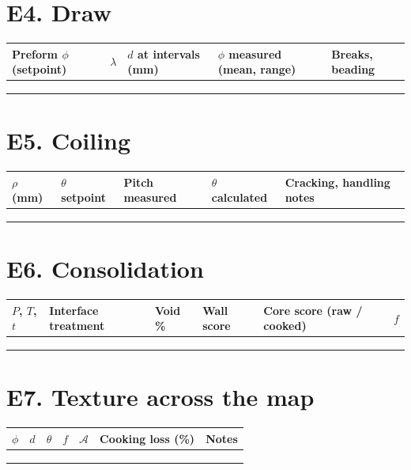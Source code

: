 \documentclass[11pt,openany]{book}
\theoremstyle{definition}
\begin{document}
\section*{E4. Draw}
\begin{center}
\small
\begin{tabularx}{\linewidth}{@{}lXXXX@{}}
\toprule
Preform $\phi$ (setpoint) & $\lambda$ & $d$ at intervals (mm) & $\phi$ measured (mean, range) & Breaks, beading \\
\midrule
 & & & & \\ \midrule
 & & & & \\ \midrule
 & & & & \\
\bottomrule
\end{tabularx}
\end{center}

\section*{E5. Coiling}
\begin{center}
\small
\begin{tabularx}{\linewidth}{@{}lXXXX@{}}
\toprule
$\rho$ (mm) & $\theta$ setpoint & Pitch measured & $\theta$ calculated & Cracking, handling notes \\
\midrule
 & & & & \\ \midrule
 & & & & \\ \midrule
 & & & & \\
\bottomrule
\end{tabularx}
\end{center}

\section*{E6. Consolidation}
\begin{center}
\small
\begin{tabularx}{\linewidth}{@{}lXXXXX@{}}
\toprule
$P$, $T$, $t$ & Interface treatment & Void \% & Wall score & Core score (raw / cooked) & $f$ \\
\midrule
 & & & & & \\ \midrule
 & & & & & \\ \midrule
 & & & & & \\
\bottomrule
\end{tabularx}
\end{center}

\section*{E7. Texture across the map}
\begin{center}
\small
\begin{tabularx}{\linewidth}{@{}llllXXX@{}}
\toprule
$\phi$ & $d$ & $\theta$ & $f$ & $\mathcal{A}$ & Cooking loss (\%) & Notes \\
\midrule
 & & & & & & \\ \midrule
 & & & & & & \\ \midrule
 & & & & & & \\
\bottomrule
\end{tabularx}
\end{center}
\end{document}

